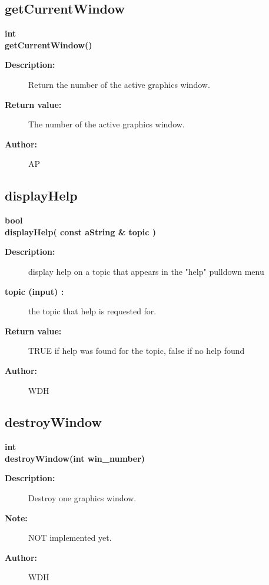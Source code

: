 \subsection{getCurrentWindow}
 
\begin{flushleft} \textbf{%
int  \\ 
\settowidth{\GLGraphicsInterfaceIncludeArgIndent}{getCurrentWindow(}%
getCurrentWindow()
}\end{flushleft}
\begin{description}
\item[{\bf Description:}] 
 Return the number of the active graphics window.

\item[{\bf Return value:}]  The number of the active graphics window.

\item[{\bf Author:}]  AP
\end{description}
\subsection{displayHelp}
 
\begin{flushleft} \textbf{%
bool  \\ 
\settowidth{\GLGraphicsInterfaceIncludeArgIndent}{displayHelp(}%
displayHelp( const aString \& topic )
}\end{flushleft}
\begin{description}
\item[{\bf Description:}] 
 display help on a topic that appears in the "help" pulldown menu
\item[{\bf topic (input) :}]  the topic that help is requested for.
\item[{\bf Return value:}]  TRUE if help was found for the topic, false if no help found
\item[{\bf Author:}]  WDH
\end{description}
\subsection{destroyWindow}
 
\begin{flushleft} \textbf{%
int  \\ 
\settowidth{\GLGraphicsInterfaceIncludeArgIndent}{destroyWindow(}%
destroyWindow(int win\_number)
}\end{flushleft}
\begin{description}
\item[{\bf Description:}] 
   Destroy one graphics window.
\item[{\bf Note:}] 
      NOT implemented yet.
\item[{\bf Author:}]  WDH
\end{description}
